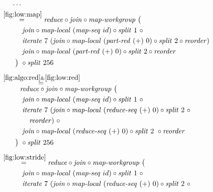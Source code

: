 \begin{figure*}[t]
\begin{align*}
  &\hspace{.5em}\ldots\\
%
  &\hspace{-2em}\quad\begin{aligned}
    &\overset{\ref{fig:low:map}}{=\hspace{.2em}}
      \reduce \circ \join \circ \mapWorkgroup\ \big(\\
    &\qquad\quad\join \circ \mapLocal\ (\mapSeq\ id) \circ \splitN\ 1\ \circ\\
    &\qquad\quad\iterateN\ 7\ (\join \circ \mapLocal\ (\partRed\ (+)\ 0) \circ \splitN\ 2\circ \reorder)\\
    &\qquad\quad\join \circ \mapLocal\ (\partRed\ (+)\ 0) \circ \splitN\ 2\circ \reorder\\
    &\qquad\big)\ \circ \splitN\ 256
  \end{aligned}\\[.5em]
%
  &\hspace{-2em}\quad\begin{aligned}
    &\overset{\ref{fig:algo:red}\&\ref{fig:low:red}}{=\hspace{.2em}}\\[-.75em]
    &\qquad\ \ 
      \reduce \circ \join \circ \mapWorkgroup\ \big(\\
    &\qquad\quad\join \circ \mapLocal\ (\mapSeq\ id) \circ \splitN\ 1\ \circ\\
    &\qquad\quad\iterateN\ 7\ (\join \circ \mapLocal\ (\reduceSeq\ (+)\ 0) \circ \splitN\ 2\ \circ\\
    &\qquad\qquad \reorder)\ \circ\\
    &\qquad\quad\join \circ \mapLocal\ (\reduceSeq\ (+)\ 0) \circ \splitN\ 2\ \circ \reorder\\
    &\qquad\big)\ \circ \splitN\ 256
  \end{aligned}\\[.5em]
%
  &\hspace{-2em}\quad\begin{aligned}
    &\overset{\ref{fig:low:stride}}{=\hspace{.2em}}
      \reduce \circ \join \circ \mapWorkgroup\ \big(\\
    &\qquad\quad\join \circ \mapLocal\ (\mapSeq\ id) \circ \splitN\ 1\ \circ\\
    &\qquad\quad\iterateN\ 7\ (\join \circ \mapLocal\ (\reduceSeq\ (+)\ 0) \circ \splitN\ 2\ \circ\\

\end{aligned}
\end{align*}
\end{figure*}
